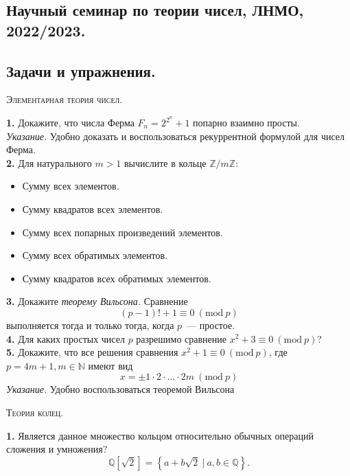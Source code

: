 \documentclass[a4, 12pt]{article}
\renewcommand{\bf}{\textbf}
\newcommand{\Mod}[1]{\ (\mathrm{mod}\ #1)}
\begin{document}
\begin{center}
\section*{Научный семинар по теории чисел, ЛНМО, 2022/2023.}
\subsection*{Задачи и упражнения.}
\end{center}
\begin{center}
    \textsc{Элементарная теория чисел.}
\end{center}

\bf{1.} Докажите, что числа Ферма $F_n = 2^{2^n} + 1$ попарно взаимно просты. \\
\emph{Указание.} Удобно доказать и воспользоваться рекуррентной формулой для чисел Ферма. \\

\bf{2.} Для натурального $m > 1$ вычислите в кольце $\mathbb{Z}/m\mathbb{Z}$:
\begin{itemize}
    \item Сумму всех элементов.
    \item Сумму квадратов всех элементов.
    \item Сумму всех попарных произведений  элементов.
    \item Сумму всех обратимых элементов.
    \item Сумму квадратов всех обратимых элементов.
\end{itemize}

\bf{3.} Докажите \emph{теорему Вильсона.} Сравнение
\[ (p - 1)! + 1 \equiv 0 \Mod{p} \]
выполняется тогда и только тогда, когда $p$~---  простое. \\

\bf{4.} Для каких простых чисел $p$ разрешимо сравнение $x^2 + 3 \equiv 0 \Mod{p}$?\\

\bf{5.} Докажите, что все решения сравнения $x^2 + 1 \equiv 0 \Mod{p}$, где $p = 4m + 1, m \in \mathbb{N}$ имеют вид
\[ x = \pm 1 \cdot 2 \cdot \ldots \cdot 2m \Mod{p} \]
\emph{Указание.} Удобно воспользоваться теоремой Вильсона

\begin{center}
    \textsc{Теория колец.}
\end{center}

\bf{1.} Является данное множество кольцом относительно обычных операций сложения и умножения?
\[ \mathbb{Q}\left[\sqrt{2}\right] = \left\{ a + b\sqrt{2} \ \bigg\vert \ a, b \in \mathbb{Q}\right\}. \]
\end{document}
